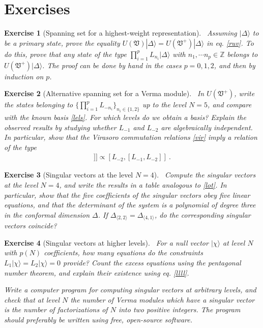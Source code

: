 \documentclass[12pt, a4paper, notitlepage, twoside]{report}
\numberwithin{equation}{section}
\theoremstyle{break}
\newtheorem{exo}{Exercise}[chapter]
\begin{document}
\section{Exercises}

\begin{exo}[Spanning set for a highest-weight representation]
 ~\label{exospan}
Assuming $|\Delta\rangle$ to be a primary state, prove the equality $U(\mathfrak{V})|\Delta\rangle =U(\mathfrak{V}^+)|\Delta\rangle$ in eq. \eqref{ruv}.
To do this, prove that any state of the type $\prod_{i=1}^p L_{n_i}|\Delta\rangle$ with $n_1,\cdots n_p\in {\mathbb{Z}}$ belongs to $U(\mathfrak{V}^+)|\Delta\rangle$.
The proof can be done by hand in the cases $p=0,1,2$, and then by induction on $p$.
\end{exo}

\begin{exo}[Alternative spanning set for a Verma module]
 ~\label{exoot}
In $U(\mathfrak{V}^+)$, write the states belonging to  $\{\prod_{i=1}^p L_{-n_i}\}_{n_i\in\{1,2\}}$ up to the level $N=5$, and compare with the known basis \eqref{lels}.
For which levels do we obtain a basis? Explain the observed results by studying whether $L_{-1}$ and $L_{-2}$ are algebraically independent.
In particular, show that the Virasoro commutation relations \eqref{vir} imply a relation of the type
\begin{align}
 [L_{-1},[L_{-1},[L_{-1},L_{-2}]]] \propto [L_{-2},[L_{-1},L_{-2}]]\ .
 \label{llll}
\end{align}
\end{exo}

\begin{exo}[Singular vectors at the level $N=4$]
~\label{exolf}
 Compute the singular vectors at the level $N=4$, and write the results in a table analogous to \eqref{lot}.
In particular, show that the five coefficients of the singular vectors obey five linear equations, and that the determinant of the system is a polynomial of degree three in the conformal dimension $\Delta$. 
If $\Delta_{\langle 2,2 \rangle} = \Delta_{\langle 4, 1\rangle}$, do the corresponding singular vectors coincide?
\end{exo}

\begin{exo}[Singular vectors at higher levels]
~\label{exohl}
 For a null vector $|\chi\rangle$ at level $N$ with $p(N)$ coefficients, how many equations do the constraints $L_1|\chi\rangle = L_2|\chi\rangle = 0$ provide? Count the excess equations using the pentagonal number theorem, and explain their existence using eq. \eqref{llll}.
 
 Write a computer program for computing singular vectors at arbitrary levels, and check that at level $N$ the number of Verma modules which have a singular vector is the number of factorizations of $N$ into two positive integers.
The program should preferably be written using free, open-source software.
\end{exo}
\end{document}
